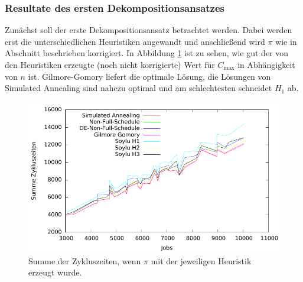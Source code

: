 \documentclass{scrreprt}
\begin{document}
\subsubsection{Resultate des ersten Dekompositionsansatzes}
\label{subsubsec:ResultateDKA1}
Zunächst soll der erste Dekompositionsansatz betrachtet werden.
Dabei werden erst die unterschiedlichen Heuristiken angewandt und anschließend wird $\pi$ wie in Abschnitt \label{sec:UnzulaessigeReihenfolgen} beschrieben korrigiert.
In Abbildung \ref{abb:kbheurplot} ist zu sehen, wie gut der von den Heuristiken erzeugte (noch nicht korrigierte) Wert für $C_{\max}$ in Abhängigkeit von $n$ ist.
Gilmore-Gomory liefert die optimale Lösung, die Lösungen von Simulated Annealing sind nahezu optimal und am schlechtesten schneidet $H_1$ ab.
\begin{figure}
    \begin{center}
        \includegraphics[width=.8\textwidth]{../prog/heuristics/plots/kbheurplot.pdf}
    \end{center}
    \caption{
        \label{abb:kbheurplot}
        Summe der Zykluszeiten, wenn $\pi$ mit der jeweiligen Heuristik erzeugt wurde.
    }
\end{figure}
\end{document}
